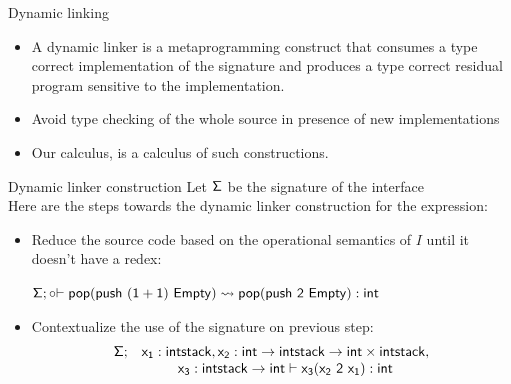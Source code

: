 \documentclass{beamer}
\begin{document}
   \begin{frame}{Dynamic linking}
    \begin{itemize}
      \item 
      A dynamic linker is a metaprogramming construct that consumes a type correct implementation of 
      the signature and produces a type correct residual program sensitive to the implementation.
      \item Avoid type checking of the whole source in presence of new implementations 
      \item Our calculus, is a calculus of such constructions.
    \end{itemize}
  \end{frame}
    \begin{frame} {Dynamic linker construction}
      Let ${\sf \Sigma}$  be the signature of the interface\\
      Here are the steps towards the dynamic linker construction for the expression:
      \begin{itemize}
      \item Reduce the source code based on the operational semantics of $I$ until it doesn't have a redex:
    
      ${\sf \Sigma}; {\sf \circ {\vdash pop (push \ (1+1) \ Empty)\rightsquigarrow pop (push \ 2 \ Empty) :int}}$
       \item Contextualize the use of the signature on previous step:
      \[\begin{array}{c c} {\sf \Sigma;}& {\sf x_1:intstack, x_2:int\rightarrow intstack\rightarrow int\times intstack,}\\ & {\sf x_3:intstack\rightarrow int \vdash x_3 (x_2 \ 2\ x_1):int} \end{array} \]
       
      \end{itemize}

  \end{frame}
\end{document}
